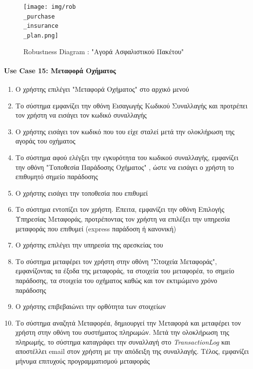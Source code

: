 \documentclass{../ol-softwaremanual}
\begin{document}
	\begin{figure}[htbp!]
		\texttt{[image: img/rob\\\_purchase\\\_insurance\\\_plan.png]}
		\caption{\en Robustness Diagram : "\gr Αγορά Ασφαλιστικού Πακέτου\en"\gr}
	\end{figure}
	
	\newpage
	\centering
	
	\paragraph{\en Use Case 15: \gr Μεταφορά Οχήματος}  
	\begin{enumerate}
		\item Ο χρήστης επιλέγει \en"\gr Μεταφορά Οχήματος\en" \gr στο αρχικό μενού
		\item Το σύστημα εμφανίζει την οθόνη Εισαγωγής Κωδικού Συναλλαγής και προτρέπει τον χρήστη να εισάγει τον κωδικό συναλλαγής
		\item Ο χρήστης εισάγει τον κωδικό που του είχε σταλεί μετά την ολοκλήρωση της αγοράς του οχήματος
		\item Το σύστημα αφού ελέγξει την εγκυρότητα του κωδικού συναλλαγής, εμφανίζει την οθόνη \en"\gr Τοποθεσία Παράδοσης Οχήματος\en" \gr, ώστε να εισάγει ο χρήστη το επιθυμητό σημείο παράδοσης
		\item Ο χρήστης εισάγει την τοποθεσία που επιθυμεί
		\item Το σύστημα εντοπίζει τον χρήστη. Έπειτα, εμφανίζει την οθόνη Επιλογής Υπηρεσίας Μεταφοράς, προτρέποντας τον χρήστη να επιλέξει την υπηρεσία μεταφοράς που επιθυμεί (\en express \gr παράδοση ή κανονική)		
		\item Ο χρήστης επιλέγει την υπηρεσία της αρεσκείας του
		\item Το σύστημα μεταφέρει τον χρήστη στην οθόνη \en"\gr Στοιχεία Μεταφοράς\en"\gr, εμφανίζοντας τα έξοδα της μεταφοράς, τα στοιχεία του μεταφορέα, το σημείο παράδοσης, τα στοιχεία του οχήματος καθώς και τον εκτιμώμενο χρόνο παράδοσης 
		\item Ο χρήστης επιβεβαιώνει την ορθότητα των στοιχείων 
		\item Το σύστημα αναζητά Μεταφορέα, δημιουργεί την Μεταφορά και μεταφέρει τον χρήστη στην οθόνη του συστήματος πληρωμών. Μετά την ολοκλήρωση της πληρωμής, το σύστημα καταγράφει την συναλλαγή στο \en \textit{TransactionLog} \gr	και αποστέλλει \en email \gr στον χρήστη με την απόδειξη της συναλλαγής. Τέλος, εμφανίζει μήνυμα επιτυχούς προγραμματισμού μεταφοράς
	\end{enumerate}
	
\end{document}
